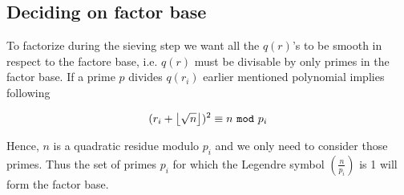 \subsection{Deciding on factor base}
To factorize during the sieving step we want all the $q(r)$'s to be smooth in respect
to the factore base, i.e. $q(r)$ must be divisable by only primes in the factor base.
If a prime $p$ divides $q(r_i)$ earlier mentioned polynomial implies following

\begin{equation}
(r_i + \myfloor{\sqrt{n}})^2 \equiv n \ \texttt{mod} \ p_i
\end{equation}

Hence, $n$ is a quadratic residue modulo $p_i$ and we only need to consider those primes. Thus the set of primes $p_i$ for which the Legendre symbol $(\frac{n}{p_i})$ is 1 will form the factor base.